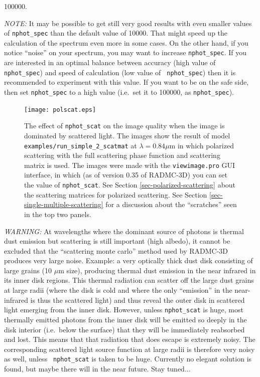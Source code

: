 \documentclass{report}
\begin{document}
\begin{itemize}
\begin{itemize}
{        100000}. 
  \end{itemize}
  {\em NOTE:} It may be possible to get still very good results with even
  smaller values of {\small\tt nphot\_spec} than the default value of
  10000. That might speed up the calculation of the spectrum even more in
  some cases. On the other hand, if you notice ``noise'' on your spectrum,
  you may want to increase {\small\tt nphot\_spec}. If you are interested
  in an optimal balance between accuracy (high value of {\small\tt
    nphot\_spec}) and speed of calculation (low value of {\small\tt
    nphot\_spec}) then it is recommended to experiment with this value.
  If you want to be on the safe side, then set {\small\tt nphot\_spec} to
  a high value (i.e.\ set it to 100000, as {\small\tt nphot\_spec}).
\end{itemize}

\begin{figure}
\centerline{\texttt{[image: polscat.eps]}}
\caption{\label{fig-polscat} The effect of {\small\tt nphot\_scat} on the
  image quality when the image is dominated by scattered light. The images
  show the result of model {\small\tt examples/run\_simple\_2\_scatmat} at
  $\lambda=0.84\mu$m in which polarized scattering with the full scattering
  phase function and scattering matrix is used. The images were made with
  the {\small\tt viewimage.pro} GUI interface, in which (as of version 0.35
  of RADMC-3D) you can set the value of {\small\tt nphot\_scat}. See Section
  \ref{sec-polarized-scattering} about the scattering matrices for polarized
  scattering. See Section \ref{sec-single-multiple-scattering} for a
  discussion about the ``scratches'' seen in the top two panels.}
\end{figure}

{\em WARNING:} At wavelengths where the dominant source of photons is
thermal dust emission but scattering is still important (high albedo), it
cannot be excluded that the ``scattering monte carlo'' method used by
RADMC-3D produces very large noise. Example: a very optically thick dust
disk consisting of large grains (10 $\mu$m size), producing thermal dust
emission in the near infrared in its inner disk regions. This thermal
radiation can scatter off the large dust grains at large radii (where the
disk is cold and where the only ``emission'' in the near-infrared is thus
the scattered light) and thus reveal the outer disk in scattered light
emerging from the inner disk. However, unless {\small\tt nphot\_scat} is
huge, most thermally emitted photons from the inner disk will be emitted so
deeply in the disk interior (i.e.~below the surface) that they will be
immediately reabsorbed and lost. This means that that radiation that does
escape is extremely noisy. The corresponding scattered light source function
at large radii is therefore very noisy as well, unless {\small\tt
  nphot\_scat} is taken to be huge. Currently no elegant solution is 
found, but maybe there will in the near future. Stay tuned... 
\end{document}
